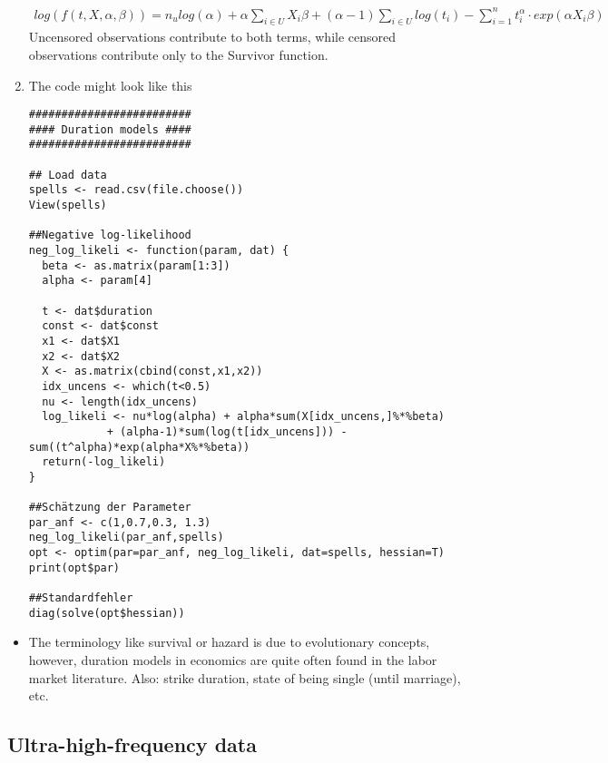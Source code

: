 \documentclass{article}
\begin{document}
\begin{solution}
\begin{enumerate}
\begin{align*}
log(f(t,X,\alpha,\beta)) = n_u log(\alpha) + \alpha \sum_{i\in U} X_i\beta + (\alpha-1) \sum_{i\in U}log(t_i)  - \sum_{i=1}^{n} t_i^\alpha \cdot exp(\alpha X_i \beta)
\end{align*}
Uncensored observations contribute to both terms, while censored observations contribute only to the Survivor function.
\item The code might look like this
\begin{verbatim}
#########################
#### Duration models ####
#########################

## Load data
spells <- read.csv(file.choose())
View(spells)

##Negative log-likelihood
neg_log_likeli <- function(param, dat) {
  beta <- as.matrix(param[1:3])
  alpha <- param[4]

  t <- dat$duration
  const <- dat$const
  x1 <- dat$X1
  x2 <- dat$X2
  X <- as.matrix(cbind(const,x1,x2))
  idx_uncens <- which(t<0.5)
  nu <- length(idx_uncens)
  log_likeli <- nu*log(alpha) + alpha*sum(X[idx_uncens,]%*%beta)
            + (alpha-1)*sum(log(t[idx_uncens])) - sum((t^alpha)*exp(alpha*X%*%beta))
  return(-log_likeli)
}

##Schätzung der Parameter
par_anf <- c(1,0.7,0.3, 1.3)
neg_log_likeli(par_anf,spells)
opt <- optim(par=par_anf, neg_log_likeli, dat=spells, hessian=T)
print(opt$par)

##Standardfehler
diag(solve(opt$hessian))
\end{verbatim}
\end{enumerate}
\begin{itemize}
\item The terminology like survival or hazard is due to evolutionary concepts, however, duration models in economics are quite often found in the labor market literature. Also: strike duration, state of being single (until marriage), etc.
\end{itemize}
\end{solution}



\subsection{Ultra-high-frequency data\label{uhfdata}}
\end{document}
